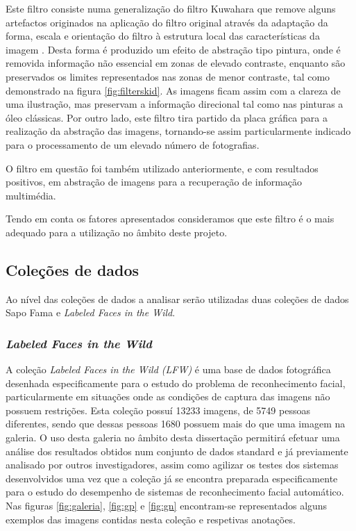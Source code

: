 Este filtro consiste numa generalização do filtro Kuwahara que remove alguns artefactos originados na aplicação do filtro original através da adaptação da forma, escala e orientação do filtro à estrutura local das características da imagem \cite{Kyprianidis2009}. Desta forma é produzido um efeito de abstração tipo pintura, onde é removida informação não essencial em zonas de elevado contraste, enquanto são preservados os limites representados nas zonas de menor contraste, tal como demonstrado na figura \ref{fig:filterskid}. As imagens ficam assim com a clareza de uma ilustração, mas preservam a informação direcional tal como nas pinturas a óleo clássicas. Por outro lado, este filtro tira partido da placa gráfica para a realização da abstração das imagens, tornando-se assim particularmente indicado para o processamento de um elevado número de fotografias.

O filtro em questão foi também utilizado anteriormente, e com resultados positivos, em abstração de imagens para a recuperação de informação multimédia. 

Tendo em conta os fatores apresentados consideramos que este filtro é o mais adequado para a utilização no âmbito deste projeto.

\subsection{Coleções de dados}
Ao nível das coleções de dados a analisar serão utilizadas duas coleções de dados Sapo Fama e \textit{Labeled Faces in the Wild}.

\subsubsection{\textit{Labeled Faces in the Wild}}
A coleção \textit{Labeled Faces in the Wild (LFW)} é uma base de dados fotográfica desenhada especificamente para o estudo do problema de reconhecimento facial, particularmente em situações onde as condições de captura das imagens não possuem restrições. Esta coleção possuí 13233 imagens, de 5749 pessoas diferentes, sendo que dessas pessoas 1680 possuem mais do que uma imagem na galeria. O uso desta galeria no âmbito desta dissertação permitirá efetuar uma análise dos resultados obtidos num conjunto de dados standard e já previamente analisado por outros investigadores, assim como agilizar os testes dos sistemas desenvolvidos uma vez que a coleção já se encontra preparada especificamente para o estudo do desempenho de sistemas de reconhecimento facial automático. Nas figuras \ref{fig:galeria}, \ref{fig:gp} e \ref{fig:gn} encontram-se representados alguns exemplos das imagens contidas nesta coleção e respetivas anotações.

